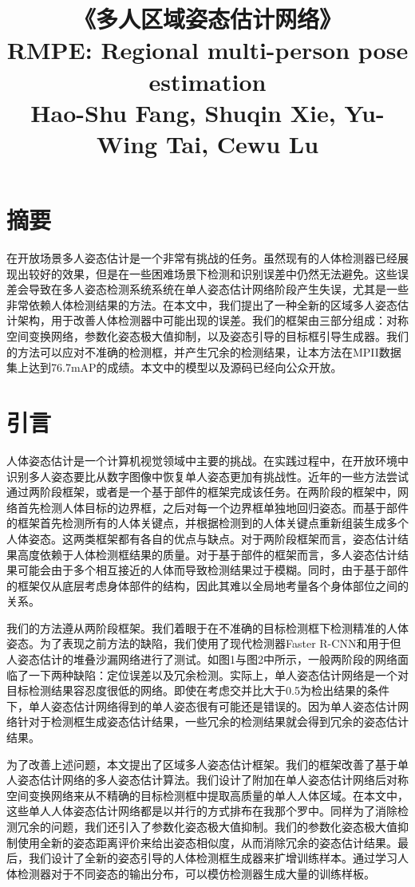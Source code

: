 \title{《多人区域姿态估计网络》\\ 
	RMPE: Regional multi-person pose estimation\\
	{\wuhao Hao-Shu Fang, Shuqin Xie, Yu-Wing Tai, Cewu Lu}\\
}
\section*{摘要}
在开放场景多人姿态估计是一个非常有挑战的任务。虽然现有的人体检测器已经展现出较好的效果，但是在一些困难场景下检测和识别误差中仍然无法避免。这些误差会导致在多人姿态检测系统系统在单人姿态估计网络阶段产生失误，尤其是一些非常依赖人体检测结果的方法。在本文中，我们提出了一种全新的区域多人姿态估计架构，用于改善人体检测器中可能出现的误差。我们的框架由三部分组成：对称空间变换网络，参数化姿态极大值抑制，以及姿态引导的目标框引导生成器。我们的方法可以应对不准确的检测框，并产生冗余的检测结果，让本方法在MPII数据集上达到76.7mAP的成绩。本文中的模型以及源码已经向公众开放。

\section*{引言}
人体姿态估计是一个计算机视觉领域中主要的挑战。在实践过程中，在开放环境中识别多人姿态要比从数字图像中恢复单人姿态更加有挑战性。近年的一些方法尝试通过两阶段框架，或者是一个基于部件的框架完成该任务。在两阶段的框架中，网络首先检测人体目标的边界框，之后对每一个边界框单独地回归姿态。而基于部件的框架首先检测所有的人体关键点，并根据检测到的人体关键点重新组装生成多个人体姿态。这两类框架都有各自的优点与缺点。对于两阶段框架而言，姿态估计结果高度依赖于人体检测框结果的质量。对于基于部件的框架而言，多人姿态估计结果可能会由于多个相互接近的人体而导致检测结果过于模糊。同时，由于基于部件的框架仅从底层考虑身体部件的结构，因此其难以全局地考量各个身体部位之间的关系。

我们的方法遵从两阶段框架。我们着眼于在不准确的目标检测框下检测精准的人体姿态。为了表现之前方法的缺陷，我们使用了现代检测器Faster R-CNN和用于但人姿态估计的堆叠沙漏网络进行了测试。如图1与图2中所示，一般两阶段的网络面临了一下两种缺陷：定位误差以及冗余检测。实际上，单人姿态估计网络是一个对目标检测结果容忍度很低的网络。即使在考虑交并比大于0.5为检出结果的条件下，单人姿态估计网络得到的单人姿态很有可能还是错误的。因为单人姿态估计网络针对于检测框生成姿态估计结果，一些冗余的检测结果就会得到冗余的姿态估计结果。

为了改善上述问题，本文提出了区域多人姿态估计框架。我们的框架改善了基于单人姿态估计网络的多人姿态估计算法。我们设计了附加在单人姿态估计网络后对称空间变换网络来从不精确的目标检测框中提取高质量的单人人体区域。在本文中，这些单人人体姿态估计网络都是以并行的方式排布在我那个罗中。同样为了消除检测冗余的问题，我们还引入了参数化姿态极大值抑制。我们的参数化姿态极大值抑制使用全新的姿态距离评价来给出姿态相似度，从而消除冗余的姿态估计结果。最后，我们设计了全新的姿态引导的人体检测框生成器来扩增训练样本。通过学习人体检测器对于不同姿态的输出分布，可以模仿检测器生成大量的训练样板。


